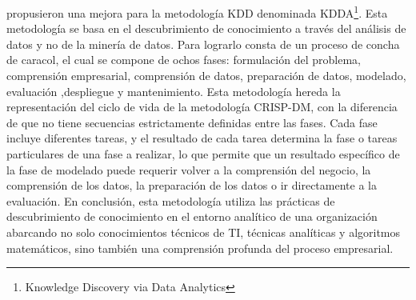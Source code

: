 \cite{Li2016} propusieron una mejora para la metodología KDD denominada KDDA\footnote{Knowledge Discovery via Data Analytics}. Esta metodología se basa en el descubrimiento de conocimiento a través del análisis de datos y no de la minería de datos. Para lograrlo consta de un proceso de concha de caracol, el cual se compone de ochos fases: formulación del problema, comprensión empresarial, comprensión de datos, preparación de datos, modelado, evaluación ,despliegue y mantenimiento. Esta metodología hereda la representación del ciclo de vida de la metodología CRISP-DM, con la diferencia de que no tiene secuencias estrictamente definidas entre las fases. Cada fase incluye diferentes tareas, y el resultado de cada tarea determina la fase o tareas particulares de una fase a realizar, lo que permite que un resultado específico de la fase de modelado puede requerir volver a la comprensión del negocio, la comprensión de los datos, la preparación de los datos o ir directamente a la evaluación. En conclusión, esta metodología utiliza las prácticas de descubrimiento de conocimiento en el entorno analítico de una organización abarcando no solo conocimientos técnicos de TI, técnicas analíticas y algoritmos matemáticos, sino también una comprensión profunda del proceso empresarial.
